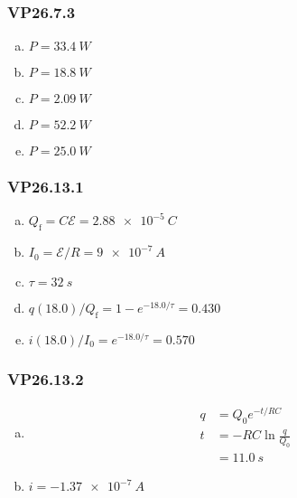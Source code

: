 \documentclass{article}
\begin{document}
\subsubsection{VP26.7.3}

\begin{enumerate}[(a)]
  \item $P = \qty{33.4}{W}$

  \item $P = \qty{18.8}{W}$

  \item $P = \qty{2.09}{W}$

  \item $P = \qty{52.2}{W}$

  \item $P = \qty{25.0}{W}$
\end{enumerate}

\subsubsection{VP26.13.1}

\begin{enumerate}[(a)]
  \item $Q_\textrm{f} = C \mathcal{E} = \qty{2.88e-5}{C}$

  \item $I_0 = \mathcal{E} / R = \qty{9e-7}{A}$

  \item $\tau = \qty{32}{s}$

  \item $q(18.0) / Q_\textrm{f} = 1 - e^{-18.0 / \tau} = 0.430$

  \item $i(18.0) / I_0 = e^{-18.0 / \tau} = 0.570$
\end{enumerate}

\subsubsection{VP26.13.2}

\begin{enumerate}[(a)]
  \item

        \begin{align*}
          q & = Q_0 e^{-t / R C}       \\
          t & = -R C \ln \frac{q}{Q_0} \\
            & = \qty{11.0}{s}
        \end{align*}

  \item $i = \qty{-1.37e-7}{A}$
\end{enumerate}
\end{document}
